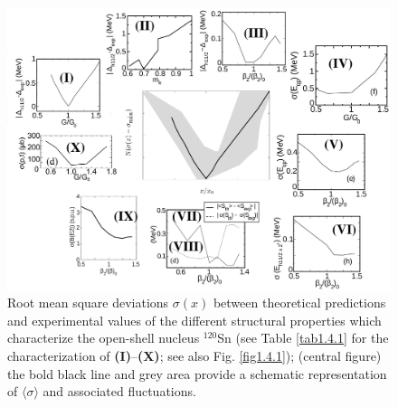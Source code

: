 \begin{figure}
\begin{center}
\centerline{\includegraphics[width=18cm]{introduccion/figs/funnel_norm_tot_try_v3.pdf}}
\caption{Root mean square deviations $\sigma(x)$ between theoretical predictions and experimental values of the different structural properties which  characterize the open-shell nucleus $^{120}$Sn (see Table \ref{tab1.4.1} for the characterization of \textbf{(I)}--\textbf{(X)}; see also Fig. \ref{fig1.4.1}); (central figure) the bold black line and grey area provide a schematic representation of $\langle\sigma\rangle$ and associated fluctuations.}\label{fig1.4.1x}
\end{center}
\end{figure}


